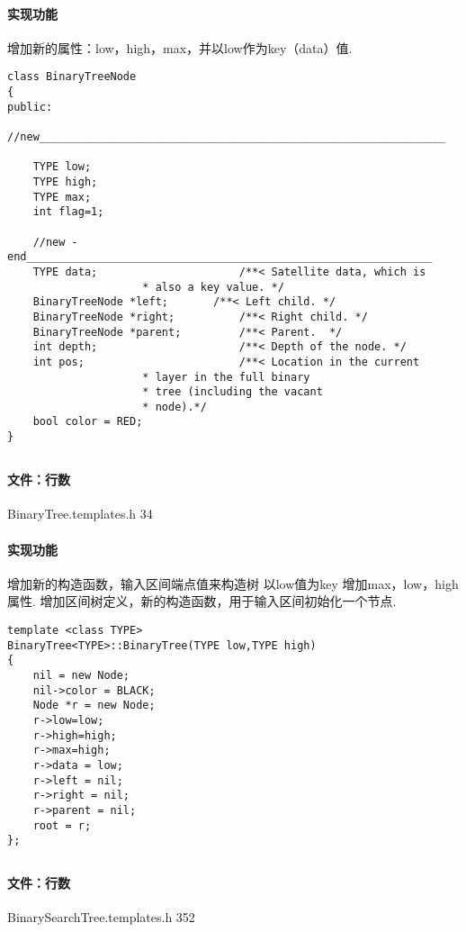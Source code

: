 \documentclass{article}
\begin{document}
\paragraph{实现功能}
增加新的属性：low，high，max，并以low作为key（data）值.
\lstset{language=C++}
\begin{lstlisting}
class BinaryTreeNode
{
public:
    //new_______________________________________________________________
    
    TYPE low;
    TYPE high;
    TYPE max;
    int flag=1;
    
    //new -end_______________________________________________________________
    TYPE data;		                /**< Satellite data, which is
					 * also a key value. */
    BinaryTreeNode *left;		/**< Left child. */
    BinaryTreeNode *right;	        /**< Right child. */
    BinaryTreeNode *parent;	        /**< Parent.  */
    int depth;		                /**< Depth of the node. */
    int pos;		                /**< Location in the current
					 * layer in the full binary
					 * tree (including the vacant
					 * node).*/
    bool color = RED;
}
\end{lstlisting}


\subsection{}
\paragraph{文件：行数}
BinaryTree.templates.h     34
\paragraph{实现功能}
增加新的构造函数，输入区间端点值来构造树
以low值为key
增加max，low，high属性.
增加区间树定义，新的构造函数，用于输入区间初始化一个节点.
\begin{lstlisting}
template <class TYPE>
BinaryTree<TYPE>::BinaryTree(TYPE low,TYPE high)
{
    nil = new Node;
    nil->color = BLACK;
    Node *r = new Node;
    r->low=low;
    r->high=high;
    r->max=high;
    r->data = low;
    r->left = nil;
    r->right = nil;
    r->parent = nil;
    root = r;
};
\end{lstlisting}


\subsection{}
\paragraph{文件：行数}
BinarySearchTree.templates.h		352
\end{document}
